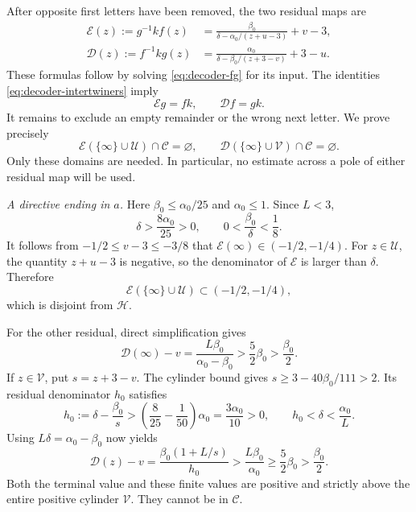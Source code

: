 After opposite first letters have been removed, the two residual maps
are
\begin{equation}\label{eq:decoder-residuals}
 \begin{split}
 \mathcal E(z):=g^{-1}kf(z)
 &=\frac{\beta_0}{\delta-\alpha_0/(z+u-3)}+v-3,\\
 \mathcal D(z):=f^{-1}kg(z)
 &=\frac{\alpha_0}{\delta-\beta_0/(z+3-v)}+3-u.
 \end{split}
\end{equation}
These formulas follow by solving \eqref{eq:decoder-fg} for its
input. The identities \eqref{eq:decoder-intertwiners} imply
\begin{equation}\label{eq:decoder-residual-return}
 \mathcal E g=fk,\qquad \mathcal D f=gk.
\end{equation}
It remains to exclude an empty remainder or the wrong next letter.
We prove precisely
\begin{equation}\label{eq:decoder-wrong}
 \mathcal E(\{\infty\}\cup\mathcal U)\cap\mathcal C=\varnothing,
 \qquad
 \mathcal D(\{\infty\}\cup\mathcal V)\cap\mathcal C=\varnothing.
\end{equation}
Only these domains are needed. In particular, no estimate across a
pole of either residual map will be used.

\smallskip\noindent\emph{A directive ending in $a$.}
Here $\beta_0\leqslant\alpha_0/25$ and $\alpha_0\leqslant1$.
Since $L<3$,
$$
 \delta>\frac{8\alpha_0}{25}>0,\qquad
 0<\frac{\beta_0}{\delta}<\frac18.
$$
It follows from $-1/2\leqslant v-3\leqslant-3/8$ that
$\mathcal E(\infty)\in(-1/2,-1/4)$.
For $z\in\mathcal U$, the quantity $z+u-3$ is negative,
so the denominator of $\mathcal E$ is larger than $\delta$.
Therefore
\begin{equation}\label{eq:decoder-a-E}
 \mathcal E(\{\infty\}\cup\mathcal U)\subset(-1/2,-1/4),
\end{equation}
which is disjoint from $\mathcal H$.

For the other residual, direct simplification gives
$$
 \mathcal D(\infty)-v=\frac{L\beta_0}{\alpha_0-\beta_0}
 >\frac52\beta_0>\frac{\beta_0}{2}.
$$
If $z\in\mathcal V$, put $s=z+3-v$. The cylinder bound gives
$s\geqslant3-40\beta_0/111>2$. Its residual denominator $h_0$ satisfies
$$
 h_0:=\delta-\frac{\beta_0}{s}
 >\left(\frac8{25}-\frac1{50}\right)\alpha_0
 =\frac{3\alpha_0}{10}>0,\qquad h_0<\delta<\frac{\alpha_0}{L}.
$$
Using $L\delta=\alpha_0-\beta_0$ now yields
\begin{equation}\label{eq:decoder-a-D}
 \mathcal D(z)-v
 =\frac{\beta_0(1+L/s)}{h_0}
 >\frac{L\beta_0}{\alpha_0}\geqslant\frac52\beta_0>\frac{\beta_0}{2}.
\end{equation}
Both the terminal value and these finite values are positive and
strictly above the entire positive cylinder $\mathcal V$. They
cannot be in $\mathcal C$.


